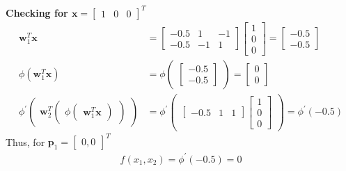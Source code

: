 \textbf{Checking for $\textbf{x} = \begin{bmatrix} 1 & 0 & 0 \end{bmatrix}^T$}
\begin{align*}
  \textbf{w}_1^T\textbf{x} &= \begin{bmatrix}
    -0.5 & 1 & -1 \\
    -0.5 & -1 & 1 
  \end{bmatrix} \begin{bmatrix}
    1\\
    0 \\
    0
  \end{bmatrix} = \begin{bmatrix}
    -0.5 \\
    -0.5
  \end{bmatrix} \\
  \phi(\textbf{w}_1^T\textbf{x}) &= \phi\begin{pmatrix}
    \begin{bmatrix}
      -0.5 \\
      -0.5
    \end{bmatrix}
  \end{pmatrix} = \begin{bmatrix}
    0 \\
    0
  \end{bmatrix} \\
  \phi^{'} \begin{pmatrix}
    \textbf{w}_2^T 
    \begin{pmatrix}
      \phi \begin{pmatrix}
        \textbf{w}_1^T\textbf{x}
    \end{pmatrix}  
  \end{pmatrix}
  \end{pmatrix} &= \phi^{'}\begin{pmatrix}
    \begin{bmatrix}
      -0.5 & 1 & 1
    \end{bmatrix} \begin{bmatrix}
      1 \\ 
      0 \\
      0
    \end{bmatrix}
  \end{pmatrix} = \phi^{'}(-0.5)
\end{align*}
Thus, for $\textbf{p}_1 = \begin{bmatrix}
  0,0
\end{bmatrix}^T$
\begin{align*}
  f(x_1,x_2) = \phi^{'} (-0.5) = 0
\end{align*}
